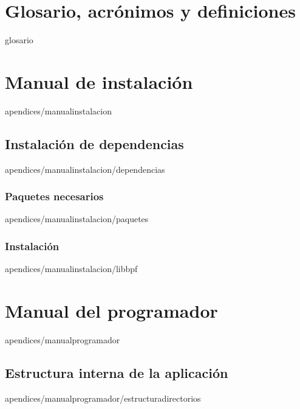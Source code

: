 \documentclass[epsbased,copyright,final,printable,covers,extendedindex,firstnumbered,tfg,gnuplot]{tfgtfmthesisuam}
\begin{document}
\chapter[Glosario, acrónimos y definiciones]{Glosario, acrónimos y definiciones\label{SEC:GLOSARIO}}{glosario}

\appendix
\chapter{Manual de instalación\label{CAP:INSTALACION}}{apendices/manualinstalacion}
  \section{Instalación de dependencias\label{SEC:DEPENDENCIAS}}{apendices/manualinstalacion/dependencias}

    \subsection{Paquetes necesarios\label{SEC:PAQUETES}}{apendices/manualinstalacion/paquetes}
    \subsection{Instalación\label{SEC:LIBBPF}}{apendices/manualinstalacion/libbpf}





\chapter{Manual del programador\label{CAP: PROGRAMADOR}}{apendices/manualprogramador}
    \section{Estructura interna de la aplicación\label{SEC:ESTRUCTURAAPlICACION}}{apendices/manualprogramador/estructuradirectorios}
\end{document}
